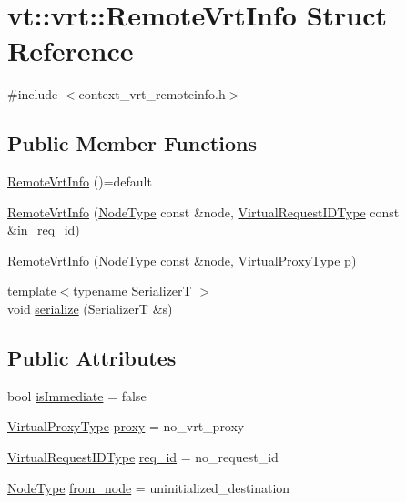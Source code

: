 \hypertarget{structvt_1_1vrt_1_1_remote_vrt_info}{}\section{vt\+:\+:vrt\+:\+:Remote\+Vrt\+Info Struct Reference}
\label{structvt_1_1vrt_1_1_remote_vrt_info}


{\ttfamily \#include $<$context\+\_\+vrt\+\_\+remoteinfo.\+h$>$}

\subsection*{Public Member Functions}
\begin{DoxyCompactItemize}
\item 
\hyperlink{structvt_1_1vrt_1_1_remote_vrt_info_a1927e40b5b1a01902f0fbe6ec7e0e888}{Remote\+Vrt\+Info} ()=default
\item 
\hyperlink{structvt_1_1vrt_1_1_remote_vrt_info_a8b19fb0188d4f449e01c2dc3393eab0d}{Remote\+Vrt\+Info} (\hyperlink{namespacevt_a866da9d0efc19c0a1ce79e9e492f47e2}{Node\+Type} const \&node, \hyperlink{namespacevt_1_1vrt_ac7ef8820ebfc383fa16f09bf46eaa2b8}{Virtual\+Request\+I\+D\+Type} const \&in\+\_\+req\+\_\+id)
\item 
\hyperlink{structvt_1_1vrt_1_1_remote_vrt_info_a0f714f22b8f7a5bc5da75d642c433abc}{Remote\+Vrt\+Info} (\hyperlink{namespacevt_a866da9d0efc19c0a1ce79e9e492f47e2}{Node\+Type} const \&node, \hyperlink{namespacevt_a1b417dd5d684f045bb58a0ede70045ac}{Virtual\+Proxy\+Type} p)
\item 
{\footnotesize template$<$typename SerializerT $>$ }\\void \hyperlink{structvt_1_1vrt_1_1_remote_vrt_info_a8388847f5961553f44f6538bc837e45a}{serialize} (SerializerT \&s)
\end{DoxyCompactItemize}
\subsection*{Public Attributes}
\begin{DoxyCompactItemize}
\item 
bool \hyperlink{structvt_1_1vrt_1_1_remote_vrt_info_a7124ec26ebeb01fa37ad2d60e6ae7337}{is\+Immediate} = false
\item 
\hyperlink{namespacevt_a1b417dd5d684f045bb58a0ede70045ac}{Virtual\+Proxy\+Type} \hyperlink{structvt_1_1vrt_1_1_remote_vrt_info_ac36c0f40eac2a594ab1d4458f795e205}{proxy} = no\+\_\+vrt\+\_\+proxy
\item 
\hyperlink{namespacevt_1_1vrt_ac7ef8820ebfc383fa16f09bf46eaa2b8}{Virtual\+Request\+I\+D\+Type} \hyperlink{structvt_1_1vrt_1_1_remote_vrt_info_a58e1d4f4c865256dae4f93aca489b61e}{req\+\_\+id} = no\+\_\+request\+\_\+id
\item 
\hyperlink{namespacevt_a866da9d0efc19c0a1ce79e9e492f47e2}{Node\+Type} \hyperlink{structvt_1_1vrt_1_1_remote_vrt_info_a3c792ce47e50024104e88ca6c8c7708e}{from\+\_\+node} = uninitialized\+\_\+destination
\end{DoxyCompactItemize}


